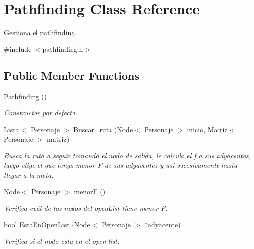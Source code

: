 \hypertarget{classPathfinding}{}\section{Pathfinding Class Reference}
\label{classPathfinding}


Gestiona el pathfinding.  




{\ttfamily \#include $<$pathfinding.\+h$>$}

\subsection*{Public Member Functions}
\begin{DoxyCompactItemize}
\item 
\mbox{\label{classPathfinding_aae14d204c5f9ee6b184764f874711341}} 
\hyperlink{classPathfinding_aae14d204c5f9ee6b184764f874711341}{Pathfinding} ()
\begin{DoxyCompactList}\small\item\em Constructor por defecto. \end{DoxyCompactList}\item 
Lista$<$ Personaje $>$ \hyperlink{classPathfinding_a1957044dbd67841116e29523b93f2d56}{Buscar\+\_\+ruta} (Node$<$ Personaje $>$ inicio, Matriz$<$ Personaje $>$ matriz)
\begin{DoxyCompactList}\small\item\em Busca la ruta a seguir tomando el nodo de salida, le calcula el f a sus adyacentes, luego elige el que tenga menor F de sus adyacentes y así sucesivamente hasta llegar a la meta. \end{DoxyCompactList}\item 
Node$<$ Personaje $>$ \hyperlink{classPathfinding_a217eb48e0c971eee607edc5b2a5ea3ba}{menorF} ()
\begin{DoxyCompactList}\small\item\em Verifica cuál de los nodos del open\+List tiene menor F. \end{DoxyCompactList}\item 
bool \hyperlink{classPathfinding_a7224a794d8fec1a475d6cf2e6a190dd3}{Esta\+En\+Open\+List} (Node$<$ Personaje $>$ $\ast$adyacente)
\begin{DoxyCompactList}\small\item\em Verifica si el nodo esta en el open list. \end{DoxyCompactList}\item 

\end{DoxyCompactItemize}
